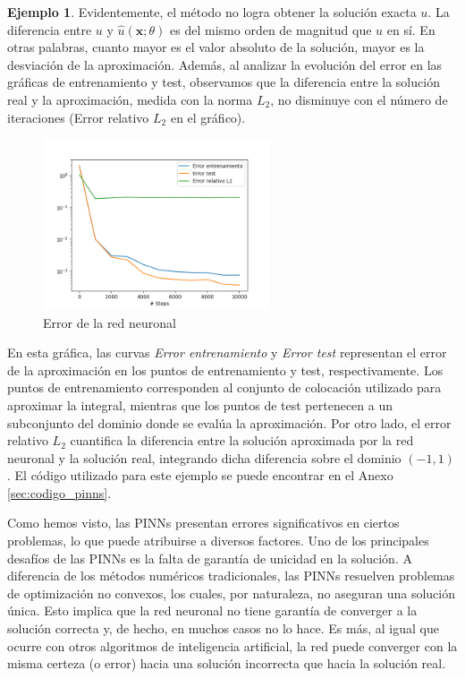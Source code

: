 \documentclass[a4paper,11pt,spanish, twoside, leqno]{tfg-uam}
\theoremstyle{definition}
\newtheorem{exmp}[teor]{Ejemplo}
\begin{document}
\begin{mdframed}
\begin{exmp}
        Evidentemente, el método no logra obtener la solución exacta $ u $. La diferencia entre $ u $ y $ \hat{u}(\mathbf{x};\theta) $ es del mismo orden de magnitud que $ u $ en sí. En otras palabras, cuanto mayor es el valor absoluto de la solución, mayor es la desviación de la aproximación. Además, al analizar la evolución del error en las gráficas de entrenamiento y test, observamos que la diferencia entre la solución real y la aproximación, medida con la norma $ L_2 $, no disminuye con el número de iteraciones (Error relativo $ L_2 $ en el gráfico).
        \begin{figure}[H]
            \centering
            \includegraphics[width=0.6\textwidth]{Figuras/test_train_pinn_error.png}
            \caption{Error de la red neuronal}
        \end{figure}

        En esta gráfica, las curvas \textit{Error entrenamiento} y \textit{Error test} representan el error de la aproximación en los puntos de entrenamiento y test, respectivamente. Los puntos de entrenamiento corresponden al conjunto de colocación utilizado para aproximar la integral, mientras que los puntos de test pertenecen a un subconjunto del dominio donde se evalúa la aproximación. Por otro lado, el error relativo $L_2$ cuantifica la diferencia entre la solución aproximada por la red neuronal y la solución real, integrando dicha diferencia sobre el dominio $(-1,1)$. El código utilizado para este ejemplo se puede encontrar en el Anexo \ref{sec:codigo_pinns}.
    \end{exmp}
\end{mdframed}

Como hemos visto, las PINNs presentan errores significativos en ciertos problemas, lo que puede atribuirse a diversos factores. Uno de los principales desafíos de las PINNs es la falta de garantía de unicidad en la solución. A diferencia de los métodos numéricos tradicionales, las PINNs resuelven problemas de optimización no convexos, los cuales, por naturaleza, no aseguran una solución única. Esto implica que la red neuronal no tiene garantía de converger a la solución correcta y, de hecho, en muchos casos no lo hace. Es más, al igual que ocurre con otros algoritmos de inteligencia artificial, la red puede converger con la misma certeza (o error) hacia una solución incorrecta que hacia la solución real.
\end{document}
